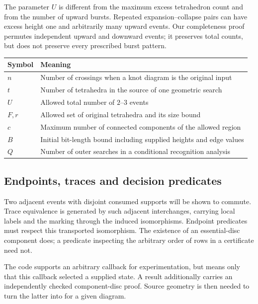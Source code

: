 The parameter $U$ is different from the maximum excess tetrahedron count and
from the number of upward bursts. Repeated expansion--collapse pairs can have
excess height one and arbitrarily many upward events. Our completeness proof
permutes independent upward and downward events; it preserves total counts,
but does not preserve every prescribed burst pattern.

\begin{center}
\begin{tabular}{@{}ll@{}}
\toprule
Symbol & Meaning\\
\midrule
$n$ & Number of crossings when a knot diagram is the original input\\
$t$ & Number of tetrahedra in the source of one geometric search\\
$U$ & Allowed total number of $2$--$3$ events\\
$F,r$ & Allowed set of original tetrahedra and its size bound\\
$c$ & Maximum number of connected components of the allowed region\\
$B$ & Initial bit-length bound including supplied heights and edge values\\
$Q$ & Number of outer searches in a conditional recognition analysis\\
\bottomrule
\end{tabular}
\end{center}

\subsection{Endpoints, traces and decision predicates}

Two adjacent events with disjoint consumed supports will be shown to commute.
Trace equivalence is generated by such adjacent interchanges, carrying local
labels and the marking through the induced isomorphisms. Endpoint predicates
must respect this transported isomorphism. The existence of an essential-disc
component does; a predicate inspecting the arbitrary order of rows in a
certificate need not.

The code supports an arbitrary callback for experimentation, but
 means only that this callback selected a supplied
state. A  result additionally carries an independently
checked component-disc proof. Source geometry is then needed to turn the latter
into  for a given diagram.
